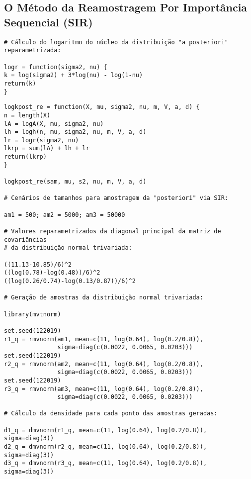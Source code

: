 \subsection*{O Método da Reamostragem Por Importância Sequencial (SIR)}

\begin{verbatim}
# Cálculo do logaritmo do núcleo da distribuição "a posteriori" reparametrizada:

logr = function(sigma2, nu) {
k = log(sigma2) + 3*log(nu) - log(1-nu)
return(k)
}
\end{verbatim}

\newpage

\begin{verbatim}
logkpost_re = function(X, mu, sigma2, nu, m, V, a, d) {
n = length(X)
lA = logA(X, mu, sigma2, nu)
lh = logh(n, mu, sigma2, nu, m, V, a, d)
lr = logr(sigma2, nu)
lkrp = sum(lA) + lh + lr
return(lkrp)
}

logkpost_re(sam, mu, s2, nu, m, V, a, d)

# Cenários de tamanhos para amostragem da "posteriori" via SIR:

am1 = 500; am2 = 5000; am3 = 50000

# Valores reparametrizados da diagonal principal da matriz de covariâncias
# da distribuição normal trivariada:

((11.13-10.85)/6)^2
((log(0.78)-log(0.48))/6)^2
((log(0.26/0.74)-log(0.13/0.87))/6)^2

# Geração de amostras da distribuição normal trivariada:

library(mvtnorm)

set.seed(122019)
r1_q = rmvnorm(am1, mean=c(11, log(0.64), log(0.2/0.8)),
			   sigma=diag(c(0.0022, 0.0065, 0.0203)))
set.seed(122019)
r2_q = rmvnorm(am2, mean=c(11, log(0.64), log(0.2/0.8)),
			   sigma=diag(c(0.0022, 0.0065, 0.0203)))
set.seed(122019)
r3_q = rmvnorm(am3, mean=c(11, log(0.64), log(0.2/0.8)),
			   sigma=diag(c(0.0022, 0.0065, 0.0203)))

# Cálculo da densidade para cada ponto das amostras geradas:

d1_q = dmvnorm(r1_q, mean=c(11, log(0.64), log(0.2/0.8)), sigma=diag(3))
d2_q = dmvnorm(r2_q, mean=c(11, log(0.64), log(0.2/0.8)), sigma=diag(3))
d3_q = dmvnorm(r3_q, mean=c(11, log(0.64), log(0.2/0.8)), sigma=diag(3))
\end{verbatim}

\newpage

